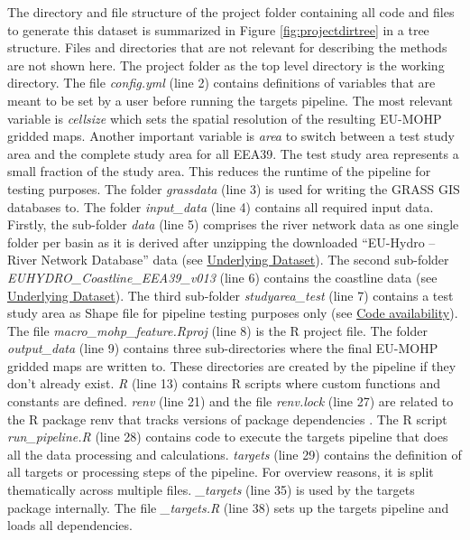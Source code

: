 \documentclass[fleqn,10pt]{wlscirep}
\begin{document}
The directory and file structure of the project folder containing all code and files to generate this dataset is summarized in Figure \ref{fig:projectdirtree} in a tree structure. Files and directories that are not relevant for describing the methods are not shown here. The project folder as the top level directory is the working directory. The file \emph{config.yml} (line 2) contains definitions of variables that are meant to be set by a user before running the targets pipeline. The most relevant variable is \emph{cellsize} which sets the spatial resolution of the resulting EU-MOHP gridded maps\cite{nolscher_eu-mohp_2021-1}. Another important variable is \emph{area} to switch between a test study area and the complete study area for all EEA39. The test study area represents a small fraction of the study area. This reduces the runtime of the pipeline for testing purposes. The folder \emph{grassdata} (line 3) is used for writing the GRASS GIS databases to. The folder \emph{input\_data} (line 4) contains all required input data. Firstly, the sub-folder \emph{data} (line 5) comprises the river network data as one single folder per basin as it is derived after unzipping the downloaded ``EU-Hydro -- River Network Database'' data\cite{noauthor_eu-hydro_2021} (see \protect\hyperlink{underlying-dataset}{Underlying Dataset}). The second sub-folder \emph{EUHYDRO\_Coastline\_EEA39\_v013} (line 6) contains the coastline data (see \protect\hyperlink{underlying-dataset}{Underlying Dataset}). The third sub-folder \emph{studyarea\_test} (line 7) contains a test study area as Shape file for pipeline testing purposes only (see \protect\hyperlink{code-availability}{Code availability}). The file \emph{macro\_mohp\_feature.Rproj} (line 8) is the R project file. The folder \emph{output\_data} (line 9) contains three sub-directories where the final EU-MOHP gridded maps\cite{nolscher_eu-mohp_2021-1} are written to. These directories are created by the pipeline if they don't already exist. \emph{R} (line 13) contains R scripts where custom functions and constants are defined. \emph{renv} (line 21) and the file \emph{renv.lock} (line 27) are related to the R package renv that tracks versions of package dependencies \cite{ushey_renv_2021}. The R script \emph{run\_pipeline.R} (line 28) contains code to execute the targets pipeline that does all the data processing and calculations. \emph{targets} (line 29) contains the definition of all targets or processing steps of the pipeline. For overview reasons, it is split thematically across multiple files. \emph{\_targets} (line 35) is used by the targets package internally. The file \emph{\_targets.R} (line 38) sets up the targets pipeline and loads all dependencies.
\end{document}
